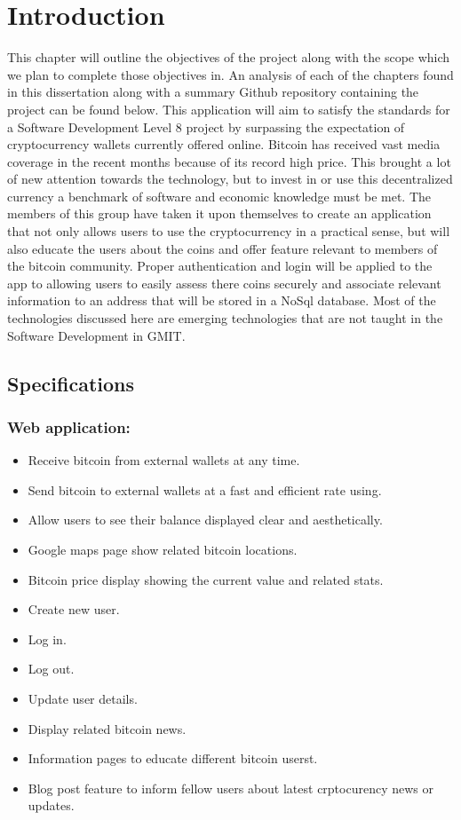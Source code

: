 \chapter{Introduction}
This chapter will outline the objectives of the project along with the scope which we plan to complete those objectives in. An analysis of each of the chapters found in this dissertation along with a summary Github repository containing the project can be found below. This application will aim to satisfy the standards for a Software Development Level 8 project by surpassing the expectation of cryptocurrency wallets currently offered online. Bitcoin has received vast media coverage in the recent months because of its record high price. This brought a lot of new attention towards the technology, but to invest in or use this decentralized currency a benchmark of software and economic knowledge must be met. The members of this group have taken it upon themselves to create an application that not only allows users to use the cryptocurrency in a practical sense, but will also educate the users about the coins and offer feature relevant to members of the bitcoin community. Proper authentication and login will be applied to the app to allowing users to easily assess there coins securely and associate relevant information to an address that will be stored in a NoSql database. Most of the technologies discussed here are emerging technologies that are not taught in the Software Development in GMIT.

\section{Specifications}
\subsection{Web application:}
\begin{itemize}
  \item Receive bitcoin from external wallets at any time.
  \item Send bitcoin to external wallets at a fast and efficient rate using.
  \item Allow users to see their balance displayed clear and aesthetically.
  \item Google maps page show related bitcoin locations.
  \item Bitcoin price display showing the current value and related stats.
  \item Create new user.
  \item Log in.
  \item Log out.
  \item Update user details.
  \item Display related bitcoin news.
  \item Information pages to educate different bitcoin userst.
  \item Blog post feature to inform fellow users about latest crptocurency news or updates.
\end{itemize}

